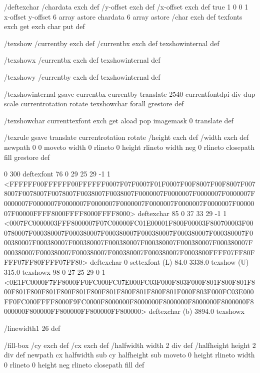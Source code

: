 /deftexchar
 { /chardata exch def
   /y-offset exch def
   /x-offset exch def
   true
   1 0 0 1 x-offset y-offset 6 array astore
   chardata
   6 array astore /char exch def
   texfonts exch get exch char put } def

/texshow
 { /currentby exch def
   /currentbx exch def
   texshowinternal } def

/texshowx
 { /currentbx exch def
   texshowinternal } def

/texshowy
 { /currentby exch def
   texshowinternal } def

/texshowinternal
 { gsave
   currentbx currentby translate
   2540 currentfontdpi div dup scale
   currentrotation rotate
   {texshowchar} forall
   grestore } def

/texshowchar
   { currenttexfont exch get aload pop imagemask 0 translate } def

/texrule
 { gsave
   translate
   currentrotation rotate
   /height exch def
   /width exch def
   newpath
    0 0 moveto
    width 0 rlineto
    0 height rlineto
    width neg 0 rlineto
    closepath
    fill
   grestore } def

0 300 deftexfont
76 0 29 25 29 -1 1 {{<FFFFFF00FFFFFF00FFFFFF0007F07F0007F01F0007F00F8007F00F8007F0078007F0078007F0078007F0038007F0038007F0000007F0000007F0000007F0000007F0000007F0000007F0000007F0000007F0000007F0000007F0000007F0000007F0000007F00000FFFF8000FFFF8000FFFF8000>}} deftexchar
85 0 37 33 29 -1 1 {{<0007FC0000003FFF8000007F07C00000FC01E00001F800F00003F800700003F000780007F000380007F000380007F000380007F000380007F000380007F000380007F000380007F000380007F000380007F000380007F000380007F000380007F000380007F000380007F000380007F000380007F000380007F000380007F0003800FFFF07FF80FFFF07FF80FFFF07FF80>}} deftexchar
0 settexfont
(L) 84.0 3338.0 texshow
(U) 315.0 texshowx
98 0 27 25 29 0 1 {{<0E1FC0000F7FF8000FF0FC000FC07E000FC03F000F803F000F801F800F801F800F801F800F801F800F801F800F801F800F801F800F801F000F803F000FC03E000FF0FC000FFFF8000F9FC0000F8000000F8000000F8000000F8000000F8000000F8000000F800000FF800000FF800000FF800000>}} deftexchar
(b) 3894.0 texshowx



/linewidth1 26 def

/fill-box
  { /cy exch def /cx exch def
    /halfwidth width 2 div def
    /halfheight height 2 div def
    newpath
     cx halfwidth sub cy halfheight sub moveto
     0 height rlineto
     width 0 rlineto
     0 height neg rlineto
     closepath
     fill } def

